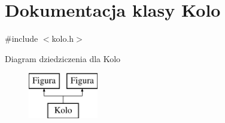 \hypertarget{classKolo}{\section{Dokumentacja klasy Kolo}
\label{classKolo}
}


{\ttfamily \#include $<$kolo.\-h$>$}

Diagram dziedziczenia dla Kolo\begin{figure}[H]
\begin{center}
\leavevmode
\includegraphics[height=2.000000cm]{classKolo}
\end{center}
\end{figure}
